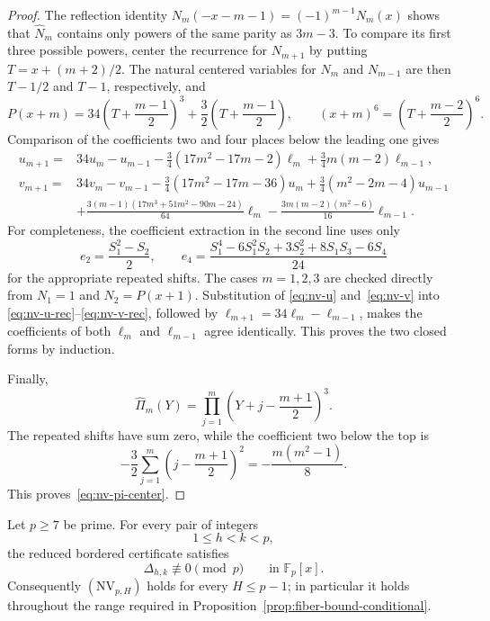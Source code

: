 \begin{proof}
The reflection identity
$N_m(-x-m-1)=(-1)^{m-1}N_m(x)$ shows that
$\widehat N_m$ contains only powers of the same parity as $3m-3$.
To compare its first three possible powers, center the recurrence for
$N_{m+1}$ by putting $T=x+(m+2)/2$.  The natural centered variables for
$N_m$ and $N_{m-1}$ are then $T-1/2$ and $T-1$, respectively, and
\[
 P(x+m)=34\left(T+\frac{m-1}{2}\right)^3
       +\frac32\left(T+\frac{m-1}{2}\right),
 \qquad
 (x+m)^6=\left(T+\frac{m-2}{2}\right)^6.
\]
Comparison of the coefficients two and four places below the leading
one gives
\begin{align}
 u_{m+1}={}&34u_m-u_{m-1}
 -\frac34(17m^2-17m-2)\ell_m
 +\frac34m(m-2)\ell_{m-1},                     \label{eq:nv-u-rec}\\
 v_{m+1}={}&34v_m-v_{m-1}
 -\frac34(17m^2-17m-36)u_m
 +\frac34(m^2-2m-4)u_{m-1}\\
 &+\frac{3(m-1)(17m^3+51m^2-90m-24)}{64}\ell_m
 -\frac{3m(m-2)(m^2-6)}{16}\ell_{m-1}.         \label{eq:nv-v-rec}
\end{align}
For completeness, the coefficient extraction in the second line uses
only
\[
 e_2=\frac{S_1^2-S_2}{2},\qquad
 e_4=\frac{S_1^4-6S_1^2S_2+3S_2^2+8S_1S_3-6S_4}{24}
\]
for the appropriate repeated shifts.  The cases $m=1,2,3$ are checked
directly from $N_1=1$ and $N_2=P(x+1)$.  Substitution of
\eqref{eq:nv-u} and~\eqref{eq:nv-v} into
\eqref{eq:nv-u-rec}--\eqref{eq:nv-v-rec}, followed by
$\ell_{m+1}=34\ell_m-\ell_{m-1}$, makes the coefficients of both
$\ell_m$ and $\ell_{m-1}$ agree identically.  This proves the two
closed forms by induction.

Finally,
\[
 \widehat\Pi_m(Y)
 =\prod_{j=1}^m
   \left(Y+j-\frac{m+1}{2}\right)^3.
\]
The repeated shifts have sum zero, while the coefficient two below the
top is
\[
 -\frac32\sum_{j=1}^m
       \left(j-\frac{m+1}{2}\right)^2
 =-\frac{m(m^2-1)}8.
\]
This proves~\eqref{eq:nv-pi-center}.
\end{proof}

\begin{theorem}
\label{thm:nv-range}
Let $p\geq7$ be prime.  For every pair of integers
\[
 1\leq h<k<p,
\]
the reduced bordered certificate satisfies
\[
 \Delta_{h,k}\not\equiv0\pmod p
 \qquad\text{in }\mathbb F_p[x].
\]
Consequently $(\mathrm{NV}_{p,H})$ holds for every $H\leq p-1$; in
particular it holds throughout the range required in
Proposition~\ref{prop:fiber-bound-conditional}.
\end{theorem}

